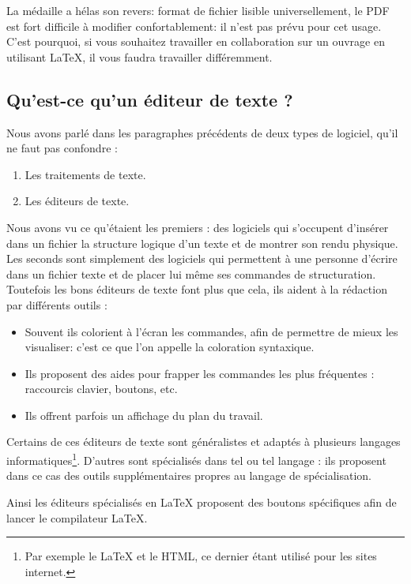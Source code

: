 La médaille a hélas son revers: format de fichier lisible universellement, le PDF est fort difficile à modifier confortablement: il n'est pas prévu pour cet usage. C'est pourquoi, si vous souhaitez travailler en collaboration sur un ouvrage en utilisant \LaTeX, il vous faudra travailler différemment.

\subsection{Qu'est-ce qu'un éditeur de texte ?}

Nous avons parlé dans les paragraphes précédents de deux types de logiciel, qu'il ne faut pas confondre :
\begin{enumerate}
	\item Les traitements de texte.
	\item Les éditeurs de texte.
\end{enumerate}

Nous avons vu ce qu'étaient les premiers : des logiciels qui s'occupent d'insérer dans un fichier la structure logique d'un texte et de montrer son rendu physique.
Les seconds sont simplement des logiciels qui permettent à une personne d'écrire dans un fichier texte et de placer lui même ses commandes de structuration.
Toutefois les bons éditeurs de texte font plus que cela, ils aident à la rédaction par différents outils :
\begin{itemize}
\item Souvent ils colorient à l'écran les commandes, afin de permettre de mieux les visualiser: c'est ce que l'on appelle la coloration syntaxique.\label{colorationsyntax}
\item Ils proposent des aides pour frapper les commandes les plus fréquentes :  raccourcis clavier,   boutons, etc.
\item Ils offrent parfois un affichage du plan du travail.
\end{itemize}

Certains de ces éditeurs de texte sont généralistes et adaptés à plusieurs langages informatiques\footnote{Par exemple le \LaTeX{} et le HTML, ce dernier étant utilisé pour les sites internet.}. D'autres sont spécialisés dans tel ou tel langage : ils proposent dans ce cas des outils supplémentaires propres au langage de spécialisation. 

Ainsi les éditeurs spécialisés en \LaTeX{} proposent des boutons spécifiques afin de lancer le compilateur \LaTeX{}.

